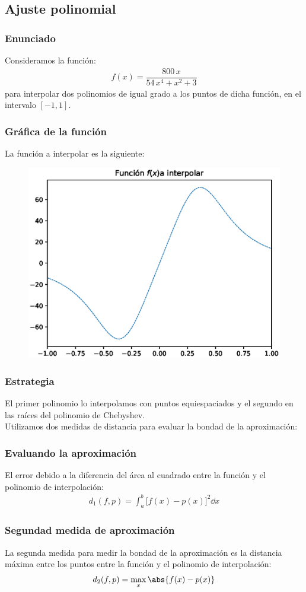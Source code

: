 \subsection{Ajuste polinomial}
\begin{frame}
\frametitle{Enunciado}
Consideramos la función:
\begin{align*}
f(x) = \dfrac{800 \, x}{54 \, x^{4} + x^{2} + 3}
\end{align*}
para interpolar dos polinomios de igual grado a los puntos de dicha función, en el intervalo $[-1, 1]$.
\end{frame}
\begin{frame}
\frametitle{Gráfica de la función}
La función a interpolar es la siguiente:
\begin{figure}
    \centering
    \includegraphics[scale=0.5]{Imagenes/Plot_Ejercicio_Chebychev_01.eps}
\end{figure}
\end{frame}
\begin{frame}
\frametitle{Estrategia}   
El primer polinomio lo interpolamos con puntos equiespaciados y el segundo en las raíces del polinomio de Chebyshev.
\\
\bigskip
\pause
Utilizamos dos medidas de distancia para evaluar la bondad de la aproximación:
\end{frame}
\begin{frame}
\frametitle{Evaluando la aproximación}
El error debido a la diferencia del área al cuadrado entre la función y el polinomio de interpolación:
\begin{align*}
d_{1} (f, p) = \int_{a}^{b} \big[ f(x) - p(x) \big]^{2} \dd{x}
\end{align*}
\end{frame}
\begin{frame}
\frametitle{Segundad medida de aproximación}
La segunda medida para medir la bondad de la aproximación es la distancia máxima entre los puntos entre la función y el polinomio de interpolación:
\begin{align*}
d_{2} (f, p) = \max_{x} \abs{f(x) - p(x)}
\end{align*}
\end{frame}
